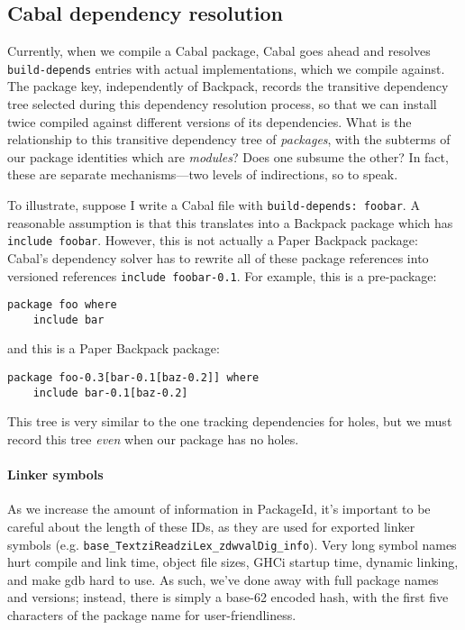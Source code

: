 \documentclass{article}
\begin{document}
\subsection{Cabal dependency resolution}

Currently, when we compile a Cabal
package, Cabal goes ahead and resolves \verb|build-depends| entries with actual
implementations, which we compile against.  The package key,
independently of Backpack, records the transitive dependency tree selected
during this dependency resolution process, so that we can install 
twice compiled against different versions of its dependencies.
What is the relationship to this transitive dependency tree of \emph{packages},
with the subterms of our package identities which are \emph{modules}?  Does one
subsume the other?  In fact, these are separate mechanisms---two levels of indirections,
so to speak.

To illustrate, suppose I write a Cabal file with \verb|build-depends: foobar|.  A reasonable assumption is that this translates into a
Backpack package which has \verb|include foobar|.  However, this is not
actually a Paper Backpack package: Cabal's dependency solver has to
rewrite all of these package references into versioned references
\verb|include foobar-0.1|.  For example, this is a pre-package:

\begin{verbatim}
package foo where
    include bar
\end{verbatim}

and this is a Paper Backpack package:

\begin{verbatim}
package foo-0.3[bar-0.1[baz-0.2]] where
    include bar-0.1[baz-0.2]
\end{verbatim}

This tree is very similar to the one tracking dependencies for holes,
but we must record this tree \emph{even} when our package has no holes.

\paragraph{Linker symbols} As we increase the amount of information in
PackageId, it's important to be careful about the length of these IDs,
as they are used for exported linker symbols (e.g.
\verb|base_TextziReadziLex_zdwvalDig_info|).  Very long symbol names
hurt compile and link time, object file sizes, GHCi startup time,
dynamic linking, and make gdb hard to use.
As such, we've done away with full package names and versions; instead,
there is simply a base-62 encoded hash, with the first five characters of the package
name for user-friendliness.
\end{document}

